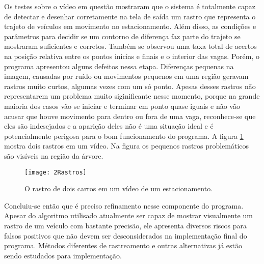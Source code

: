 Os testes sobre o vídeo em questão mostraram que o sistema é totalmente capaz de detectar e desenhar corretamente na tela de saída um rastro que representa o trajeto de veículos em movimento no estacionamento. Além disso, as condições e parâmetros para decidir se um contorno de diferença faz parte do trajeto se mostraram suficientes e corretos. Também se observou uma taxa total de acertos na posição relativa entre os pontos inicias e finais e o interior das vagas. Porém, o programa apresentou alguns defeitos nessa etapa. Diferenças pequenas na imagem, causadas por ruído ou movimentos pequenos em uma região geravam rastros muito curtos, algumas vezes com um só ponto. Apesas desses rastros não representarem um problema muito siginificante nesse momento, porque na grande maioria dos casos vão se iniciar e terminar em ponto quase iguais e não vão acusar que houve movimento para dentro ou fora de uma vaga, reconhece-se que eles são indesejados e a aparição deles não é uma situação ideal e é potencialmente perigosa para o bom funcionamento do programa. A figura \ref{testesRastrosFig} mostra dois rastros em um vídeo. Na figura os pequenos rastros problemáticos são visíveis na região da árvore.

\begin{figure}
 \centering
  \texttt{[image: 2Rastros]}
    \caption{O rastro de dois carros em um vídeo de um estacionamento.}
\label{testesRastrosFig}
\end{figure}

Concluiu-se então que é preciso refinamento nesse componente do programa. Apesar do algoritmo utilisado atualmente ser capaz de mostrar visualmente um rastro de um veículo com bastante precisão, ele apresenta diversos riscos para falsos positivos que não devem ser desconsiderados na implementação final do programa. Métodos diferentes de rastreamento e outras alternativas já estão sendo estudados para implementação.


